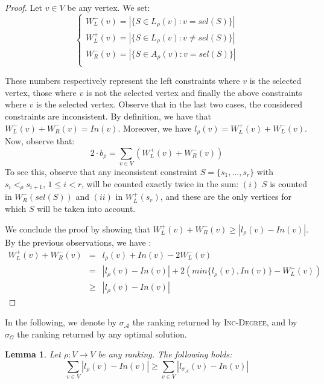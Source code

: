 \documentclass[11pt]{article}
\newtheorem{lemma}[theorem]{Lemma}
\begin{document}
\begin{proof}
Let $v \in V$ be any vertex. We set: 
\[
	\left\{
		\begin{array}{ll}
			W^-_L(v) = |\{S \in L_\rho(v) : v = sel(S)\}| \\
			W^+_L(v) = |\{S \in L_\rho(v) : v \neq sel(S)\}| \\
			W^-_R(v) = |\{S \in A_\rho(v) : v = sel(S)\}| \\
		\end{array}
	\right.
\]

These numbers respectively represent the left constraints where $v$ is the selected vertex, those where $v$ is not the selected vertex and finally the above constraints where $v$ is the selected vertex. Observe that in the last two cases, the considered constraints are inconsistent. 
By definition, we have that $W^-_L(v) + W^-_R(v) = In(v)$. Moreover, we have $ l_\rho(v) = W^+_L(v) + W^-_L(v)$. Now, observe that:
$$ 2 \cdot b_\rho = \displaystyle\sum_{v \in V} ( W^+_L(v) + W^-_R(v) )$$
To see this, observe that any inconsistent constraint $S = \{s_1, \ldots, s_r\}$ with $s_i <_\rho s_{i+1}$, $1 \leqslant i < r$, will be counted exactly twice in the sum: $(i)$ $S$ is counted in $W^-_R(sel(S))$ and $(ii)$ in $W^+_L(s_r)$, and these are the only vertices for which $S$ will be taken into account.

We conclude the proof by showing that $W^+_L(v) + W^-_R(v) \geqslant |l_\rho(v) - In(v) |$. By the previous observations, we have :
\begin{eqnarray*}
	W^+_L(v) + W^-_R(v) & = & l_\rho(v) + In(v) - 2W^-_L(v) \\
			    & = & |l_\rho(v) - In(v)| + 2(min\{l_\rho(v), In(v)\} - W^-_L(v)) \\
			    & \geqslant & |l_\rho(v) - In(v) |
\end{eqnarray*}
 \end{proof}

In the following, we denote by $\sigma_\mathcal{A}$ the ranking returned by \textsc{Inc-Degree}, and by $\sigma_\mathcal{O}$ the ranking returned by any optimal solution.

\begin{lemma}
\label{lem:approxtwo}
Let $\rho : V \rightarrow V$ be any ranking. The following holds:
$$\displaystyle\sum_{v \in V} |l_\rho(v) - In(v)| \geqslant \displaystyle\sum_{v \in V} | l_{\sigma_\mathcal{A}}(v) - In(v)|$$
\end{lemma}
\end{document}
